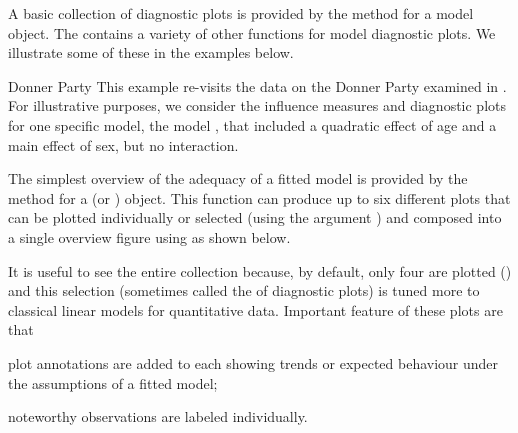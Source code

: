 \documentclass[11pt]{book}\usepackage[]{graphicx}\usepackage[]{color}
\begin{document}
A basic collection of diagnostic plots is provided by the  method for a 
 model object. The  contains a variety of other functions
for model diagnostic plots.  We illustrate some of these in the examples below.



\begin{Example}[donner2]{Donner Party}
This example re-visits the data on the Donner Party examined in .
For illustrative purposes, we consider the influence measures and diagnostic plots
for one specific model, the model , that included a 
quadratic effect of age and a main effect of sex, but no interaction.

The simplest overview of the adequacy of a fitted model is provided by the
 method for a  (or ) object.
This function can produce up to six different plots that can be plotted individually
or selected (using the argument ) and composed into a single overview
figure using  as shown below. 

It is useful to see the entire collection because, by default, only four
are plotted () and this selection 
(sometimes called the  of diagnostic plots)
is tuned more to classical
linear models for quantitative data.  Important feature of these plots are that
\begin{seriate}
 \item plot annotations are added to each showing trends or expected behaviour
 under the assumptions of a fitted model;
 \item noteworthy observations are labeled individually.
\end{seriate}


\end{Example}
\end{document}
